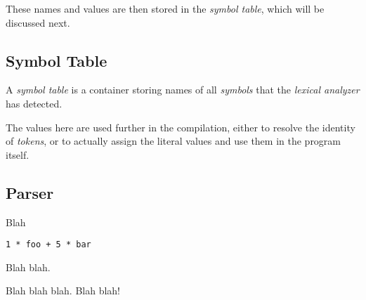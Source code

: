             These names and values are then stored in the \emph{symbol table}, which will be discussed next.

        \subsection{Symbol Table}

            A \emph{symbol table} is a container storing names of all \emph{symbols} that the \emph{lexical analyzer} has detected.

            The values here are used further in the compilation, either to resolve the identity of \emph{tokens}, or to actually assign the literal values and use them in the program itself.

        \subsection{Parser}

            Blah

            \begin{center}
            \verb|1 * foo + 5 * bar|
            \end{center}

            Blah blah.

            \begin{center}\end{center}

            Blah blah blah. Blah blah!

